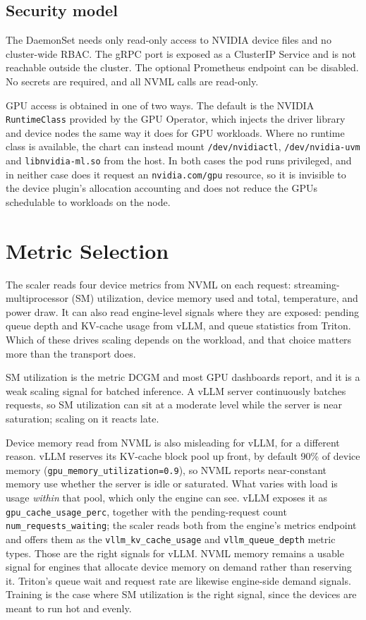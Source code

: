\documentclass[11pt]{article}
\begin{document}
\subsection{Security model}
The DaemonSet needs only read-only access to NVIDIA device files and no
cluster-wide RBAC. The gRPC port is exposed as a ClusterIP Service and is not
reachable outside the cluster. The optional Prometheus endpoint can be disabled.
No secrets are required, and all NVML calls are read-only.

GPU access is obtained in one of two ways. The default is the NVIDIA
\texttt{RuntimeClass} provided by the GPU Operator, which injects the driver
library and device nodes the same way it does for GPU workloads. Where no
runtime class is available, the chart can instead mount
\texttt{/dev/nvidiactl}, \texttt{/dev/nvidia-uvm} and \texttt{libnvidia-ml.so}
from the host. In both cases the pod runs privileged, and in neither case does
it request an \texttt{nvidia.com/gpu} resource, so it is invisible to the device
plugin's allocation accounting and does not reduce the GPUs schedulable to
workloads on the node.

\section{Metric Selection}

The scaler reads four device metrics from NVML on each request: streaming-multiprocessor
(SM) utilization, device memory used and total, temperature, and power draw. It can also
read engine-level signals where they are exposed: pending queue depth and KV-cache usage
from vLLM, and queue statistics from Triton. Which of these drives scaling depends on the
workload, and that choice matters more than the transport does.

SM utilization is the metric DCGM and most GPU dashboards report, and it is a weak scaling
signal for batched inference. A vLLM server continuously batches requests, so SM utilization
can sit at a moderate level while the server is near saturation; scaling on it reacts late.

Device memory read from NVML is also misleading for vLLM, for a different reason. vLLM
reserves its KV-cache block pool up front, by default 90\% of device memory
(\texttt{gpu\_memory\_utilization=0.9}), so NVML reports near-constant memory use whether
the server is idle or saturated. What varies with load is usage \emph{within} that pool,
which only the engine can see. vLLM exposes it as \texttt{gpu\_cache\_usage\_perc}, together
with the pending-request count \texttt{num\_requests\_waiting}; the scaler reads both from
the engine's metrics endpoint and offers them as the \texttt{vllm\_kv\_cache\_usage} and
\texttt{vllm\_queue\_depth} metric types. Those are the right signals for vLLM. NVML memory
remains a usable signal for engines that allocate device memory on demand rather than
reserving it. Triton's queue wait and request rate are likewise engine-side demand signals.
Training is the case where SM utilization is the right signal, since the devices are meant
to run hot and evenly.
\end{document}
